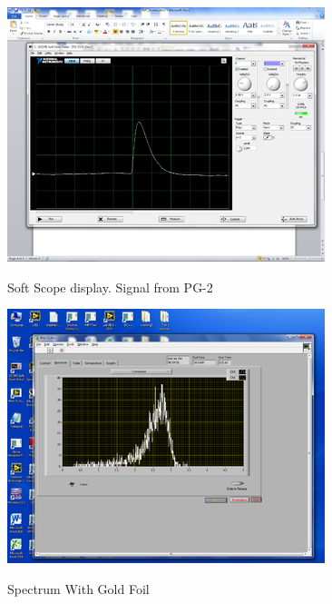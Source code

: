 \documentclass{../lab}
\begin{document}
\begin{figure}[h]
\begin{minipage}{0.49\linewidth}
    \href{http://experimentationlab.berkeley.edu/sites/default/files/images/350px-RUT_Soft_Scope.png}{\includegraphics[width=\linewidth]{images/350px-RUT_Soft_Scope.png}}
    \caption{Soft Scope display. Signal from PG-2}
    \label{fig:SoftScopeDisplay}
    \end{minipage} \hfill
    \begin{minipage}{0.49\linewidth}
        \href{http://experimentationlab.berkeley.edu/sites/default/files/images/350px-RUT_Spectrum_with_Foil.png}{\includegraphics[width=\linewidth]{images/350px-RUT_Spectrum_with_Foil.png}}
    \caption{Spectrum With Gold Foil}
    \label{fig:350px-RUT_Spectrum_with_Foil}
    \end{minipage}
\end{figure}
\end{document}
